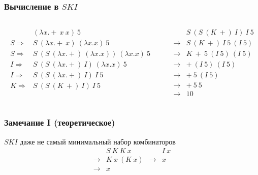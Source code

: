 \begin{frame}
    \frametitle{Вычисление в $SKI$}

    \begin{columns}
        \begin{column}{0.5\textwidth}
            \begin{align*}
                                & (\lambda x.+\ x\ x)\ 5                                 \\
                S \Rightarrow{} & S\ (\lambda x.+\ x)\ (\lambda x.x)\ 5                  \\
                S \Rightarrow{} & S\ (S\ (\lambda x.+)\ (\lambda x.x))\ (\lambda x.x)\ 5 \\
                I \Rightarrow{} & S\ (S\ (\lambda x.+)\ I)\ (\lambda x.x)\ 5             \\
                I \Rightarrow{} & S\ (S\ (\lambda x.+)\ I)\ I\ 5                         \\
                K \Rightarrow{} & S\ (S\ (K\ +)\ I)\ I\ 5
            \end{align*}
        \end{column}
        \begin{column}{0.5\textwidth}
            \begin{align*}
                              & S\ (S\ (K\ +)\ I)\ I\ 5 \\
                \rightarrow{} & S\ (K\ +)\ I\ 5\ (I\ 5) \\
                \rightarrow{} & K\ +\ 5\ (I\ 5)\ (I\ 5) \\
                \rightarrow{} & +\ (I\ 5)\ (I\ 5)       \\
                \rightarrow{} & +\ 5\ (I\ 5)            \\
                \rightarrow{} & +\ 5\ 5                 \\
                \rightarrow{} & 10
            \end{align*}
        \end{column}
    \end{columns}

\end{frame}

\begin{frame}
    \frametitle{Замечание I (теоретическое)}

    $SKI$ даже не самый минимальный набор комбинаторов
    \begin{align*}
                      & S\ K\ K\ x   &               & I\ x \\
        \rightarrow{} & K\ x\ (K\ x) & \rightarrow{} & x    \\
        \rightarrow{} & x            &               &
    \end{align*}

\end{frame}


